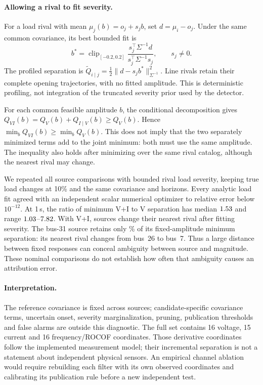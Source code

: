 \paragraph{Allowing a rival to fit severity.}
For a load rival with mean $\mu_j(b)=o_j+s_jb$, set
$d=\mu_i-o_j$. Under the same common covariance, its best bounded fit is
\begin{equation}
 b^*=\operatorname{clip}_{[-0.2,0.2]}
 \frac{s_j^\top\Sigma^{-1}d}{s_j^\top\Sigma^{-1}s_j},
 \qquad s_j\ne0.
\end{equation}
The profiled separation is
$\widetilde Q_{i\mid j}=\tfrac12\|d-s_jb^*\|_{\Sigma^{-1}}^2$.
Line rivals retain their complete opening trajectories, with no fitted
amplitude. This is deterministic profiling, not integration of the
truncated severity prior used by the detector.

For each common feasible amplitude $b$, the conditional decomposition
gives $Q_{VI}(b)=Q_V(b)+Q_{I\mid V}(b)\ge Q_V(b)$. Hence
$\min_bQ_{VI}(b)\ge\min_bQ_V(b)$. This does not imply that the two
separately minimized terms add to the joint minimum: both must use the
same amplitude. The inequality also holds after minimizing over the
same rival catalog, although the nearest rival may change.

We repeated all source comparisons with bounded rival load severity,
keeping true load changes at 10\% and the same covariance and horizons.
Every analytic load fit agreed with an independent scalar numerical
optimizer to relative error below $10^{-12}$. At 1\,s, the ratio of
minimum V+I to V separation has median $1.53$
and range $1.03$--$7.82$.
With V+I, \ProfileChannelNearestChanges{} sources change their nearest
rival after fitting severity. The bus-31 source retains only
\ProfileChannelBusThirtyOneRetained\% of its fixed-amplitude minimum
separation: its nearest rival changes from bus~26 to bus~7.
Thus a large distance between fixed responses can conceal ambiguity
between source and magnitude. These nominal comparisons do not establish
how often that ambiguity causes an attribution error.

\paragraph{Interpretation.}
The reference covariance is fixed across sources; candidate-specific
covariance terms, uncertain onset, severity marginalization, pruning,
publication thresholds and false alarms are outside this diagnostic.
The full set contains 16 voltage, 15 current and 16 frequency/ROCOF
coordinates. Those derivative coordinates follow the implemented
measurement model; their incremental separation is not a statement
about independent physical sensors. An empirical channel ablation
would require rebuilding each filter with its own observed coordinates
and calibrating its publication rule before a new independent test.

